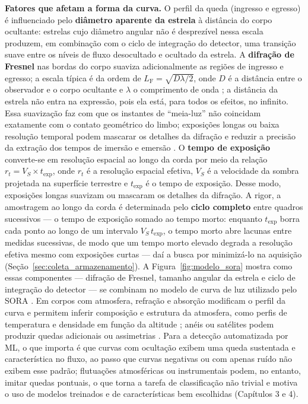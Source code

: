 \textbf{Fatores que afetam a forma da curva.} O perfil da queda (ingresso e egresso) é influenciado pelo \textbf{diâmetro aparente da estrela} à distância do corpo ocultante: estrelas cujo diâmetro angular não é desprezível nessa escala produzem, em combinação com o ciclo de integração do detector, uma transição suave entre os níveis de fluxo desocultado e ocultado da estrela. A \textbf{difração de Fresnel} nas bordas do corpo suaviza adicionalmente as regiões de ingresso e egresso; a escala típica é da ordem de \(L_{\mathrm{F}} = \sqrt{D\lambda/2}\), onde \(D\) é a distância entre o observador e o corpo ocultante e \(\lambda\) o comprimento de onda \citep{Roques1987}; a distância da estrela não entra na expressão, pois ela está, para todos os efeitos, no infinito. Essa suavização faz com que os instantes de ``meia-luz'' não coincidam exatamente com o contato geométrico do limbo; exposições longas ou baixa resolução temporal podem mascarar os detalhes da difração e reduzir a precisão da extração dos tempos de imersão e emersão \citep{SORA2022}. O \textbf{tempo de exposição} converte-se em resolução espacial ao longo da corda por meio da relação \(r_t = V_S \times t_{\mathrm{exp}}\), onde \(r_t\) é a resolução espacial efetiva, \(V_S\) é a velocidade da sombra projetada na superfície terrestre e \(t_{\mathrm{exp}}\) é o tempo de exposição. Desse modo, exposições longas suavizam ou mascaram os detalhes da difração. A rigor, a amostragem ao longo da corda é determinada pelo \textbf{ciclo completo} entre quadros sucessivos --- o tempo de exposição somado ao tempo morto: enquanto \(t_{\mathrm{exp}}\) borra cada ponto ao longo de um intervalo \(V_S\,t_{\mathrm{exp}}\), o tempo morto abre lacunas entre medidas sucessivas, de modo que um tempo morto elevado degrada a resolução efetiva mesmo com exposições curtas --- daí a busca por minimizá-lo na aquisição (Seção~\ref{sec:coleta_armazenamento}). A Figura~\ref{fig:modelo_sora} mostra como essas componentes --- difração de Fresnel, tamanho angular da estrela e ciclo de integração do detector --- se combinam no modelo de curva de luz utilizado pelo SORA \citep{SORA2022}. Em corpos com atmosfera, refração e absorção modificam o perfil da curva e permitem inferir composição e estrutura da atmosfera, como perfis de temperatura e densidade em função da altitude \citep{Sicardy2016}; anéis ou satélites podem produzir quedas adicionais ou assimetrias \citep{BragaRibas2014}. Para a detecção automatizada por ML, o que importa é que curvas com ocultação exibem uma queda sustentada e característica no fluxo, ao passo que curvas negativas ou com apenas ruído não exibem esse padrão; flutuações atmosféricas ou instrumentais podem, no entanto, imitar quedas pontuais, o que torna a tarefa de classificação não trivial e motiva o uso de modelos treinados e de características bem escolhidas (Capítulos 3 e 4).

